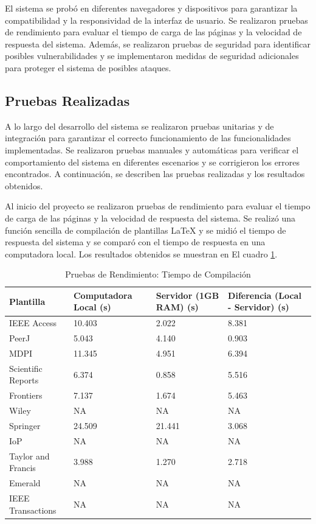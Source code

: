 El sistema se probó en diferentes navegadores y dispositivos para garantizar la compatibilidad y la responsividad de la interfaz de usuario. Se realizaron pruebas de rendimiento para evaluar el tiempo de carga de las páginas y la velocidad de respuesta del sistema. Además, se realizaron pruebas de seguridad para identificar posibles vulnerabilidades y se implementaron medidas de seguridad adicionales para proteger el sistema de posibles ataques.

\subsection{Pruebas Realizadas}
A lo largo del desarrollo del sistema se realizaron pruebas unitarias y de integración para garantizar el correcto funcionamiento de las funcionalidades implementadas. Se realizaron pruebas manuales y automáticas para verificar el comportamiento del sistema en diferentes escenarios y se corrigieron los errores encontrados. A continuación, se describen las pruebas realizadas y los resultados obtenidos.

Al inicio del proyecto se realizaron pruebas de rendimiento para evaluar el tiempo de carga de las páginas y la velocidad de respuesta del sistema. Se realizó una función sencilla de compilación de plantillas LaTeX y se midió el tiempo de respuesta del sistema y se comparó con el tiempo de respuesta en una computadora local. Los resultados obtenidos se muestran en El cuadro \ref{tab:pruebas-rendimiento}.

\begin{table}[H]
    \centering
    \begin{tabular}{|p{5cm}|p{3cm}|p{3cm}|p{3cm}|}
        \hline
        \textbf{Plantilla} & \textbf{Computadora Local (s)} & \textbf{Servidor (1GB RAM) (s)} & \textbf{Diferencia (Local - Servidor) (s)} \\
        \hline
        IEEE Access & 10.403 & 2.022 & 8.381 \\
        PeerJ & 5.043 & 4.140 & 0.903 \\
        MDPI & 11.345 & 4.951 & 6.394 \\
        Scientific Reports & 6.374 & 0.858 & 5.516 \\
        Frontiers & 7.137 & 1.674 & 5.463 \\
        Wiley & NA & NA & NA \\
        Springer & 24.509 & 21.441 & 3.068 \\
        IoP & NA & NA & NA \\
        Taylor and Francis & 3.988 & 1.270 & 2.718 \\
        Emerald & NA & NA & NA \\
        IEEE Transactions & NA & NA & NA \\
        \hline
    \end{tabular}
    \caption{Pruebas de Rendimiento: Tiempo de Compilación}
    \label{tab:pruebas-rendimiento}
\end{table}

